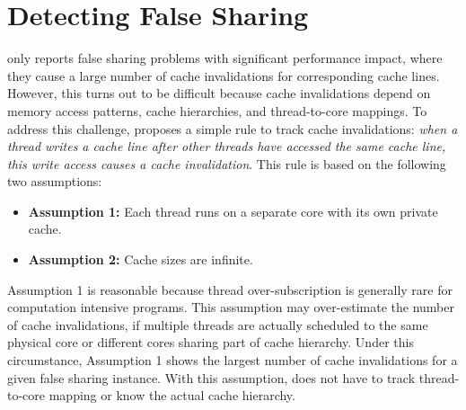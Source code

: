 \section{Detecting False Sharing}
\label{sec:detect}

\cheetah{} only reports false sharing problems with significant performance impact, where they cause a large number of cache invalidations for corresponding cache lines. However, this turns out to be difficult because cache invalidations depend on memory access patterns, cache hierarchies, and thread-to-core mappings. 
To address this challenge, \cheetah{} proposes a simple rule to track cache invalidations: \emph{when a thread writes a cache line after other threads have accessed the same cache line, this write access causes a cache invalidation}. This rule is based on the following two assumptions:
 

\begin{itemize} 
\item {\bf Assumption 1:} Each thread runs on a separate core with its own private cache. 

\item {\bf Assumption 2: } Cache sizes are infinite. 
 
\end{itemize}

Assumption 1 is reasonable because thread over-subscription is generally rare for computation intensive programs. This assumption may over-estimate the number of cache invalidations, if multiple threads are actually scheduled to the same physical core or different cores sharing part of cache hierarchy. Under this circumstance, Assumption 1 shows the largest number of cache invalidations for a given false sharing instance. With this assumption, \cheetah{} does not have to track thread-to-core mapping or know the actual cache hierarchy. 

